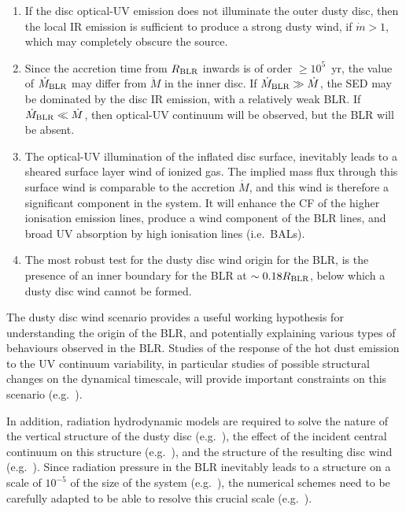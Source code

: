 \documentclass[a4paper,fleqn,usenatbib]{mnras}
\newcommand{\mdot}{\dot{M}}
\begin{document}
\begin{enumerate}
\item If the disc optical-UV emission does not illuminate the outer dusty disc, then 
the local IR emission is sufficient to produce a strong dusty wind, if $\dot{m}>1$, 
which may completely obscure the source. 

\item Since the accretion time from $R_{\rm BLR}$ inwards is of order  
$\ge 10^5$~yr, the value of $\mdot_{\rm BLR}$ may differ from $\mdot$ in the inner disc. 
If $\mdot_{\rm BLR}\gg \mdot$, the SED may be dominated by the disc IR emission,
with a relatively weak BLR. If $\mdot_{\rm BLR}\ll \mdot$, then optical-UV continuum 
will be observed, but the BLR will be absent.

\item The optical-UV illumination of the inflated disc surface, inevitably leads to 
a sheared surface layer wind of ionized gas.
The implied mass flux through this surface wind is comparable to the accretion $\mdot$,
and this wind is therefore a significant component in the system. It will enhance the CF
of the higher ionisation emission lines, produce a wind component of the BLR lines,
and broad UV absorption by high ionisation lines (i.e.\ BALs). 

\item The most robust test for the dusty disc wind origin for the BLR, is the presence of
an inner boundary for the BLR at $\sim 0.18R_{\rm BLR}$, below which a dusty disc wind cannot
be formed. 

\end{enumerate}

The dusty disc wind scenario provides a useful working hypothesis for understanding the 
origin of the BLR, and potentially explaining various types of behaviours observed in the
BLR. Studies of the response of the hot dust emission to the UV continuum variability, 
in particular
studies of possible structural changes on the dynamical timescale, will provide important
constraints on this scenario (e.g.\ \citealt{Kishimoto13, Schnule15}). 

In addition, radiation hydrodynamic models are required to
solve the nature of the vertical structure of the dusty disc (e.g.\ \citealt*{Jiang13, Davis14}), the effect of the
incident central continuum on this structure (e.g.\ \citealt{Proga14}), and the structure of the 
resulting disc wind (e.g.\ \citealt{Zhang17}). 
Since radiation pressure in the BLR inevitably leads to a structure on a scale of $10^{-5}$ of the size
of the system (e.g.\ \citealt{paperII, paperIV}), the numerical schemes need to be carefully 
adapted to be able to resolve this crucial scale (e.g.\ \citealt{Namekata16}).
\end{document}
